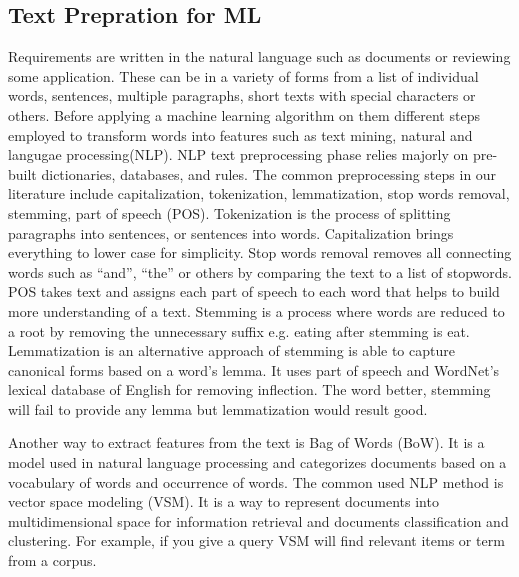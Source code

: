\subsection{Text Prepration for ML}
\label{sec:preprocessing}

Requirements are written in the natural language such as documents or reviewing
some application. These can be in a variety of forms from a list of individual
words, sentences, multiple paragraphs, short texts with special characters or
others. Before applying a machine learning algorithm on them different steps
employed to transform words into features such as text mining, natural and langugae processing(NLP). NLP text preprocessing phase relies
majorly on pre-built dictionaries, databases, and rules. The common
preprocessing steps in our literature include capitalization, tokenization,
lemmatization, stop words removal, stemming, part of speech (POS). Tokenization
is the process of splitting paragraphs into sentences, or sentences into words.
Capitalization brings everything to lower case for simplicity. Stop words
removal removes all connecting words such as ``and'', ``the'' or others by
comparing the text to a list of stopwords. POS takes text and assigns each part of speech to each
word that helps to build more understanding of a text. Stemming is a process
where words are reduced to a root by removing the unnecessary suffix e.g. eating
after stemming is eat. Lemmatization is an alternative approach of stemming is
able to capture canonical forms based on a word's lemma. It uses part of speech
and WordNet’s lexical database of English for removing inflection. The word
better, stemming will fail to provide any lemma but lemmatization would result
good.

 	Another way to extract features from the text is Bag of Words (BoW). It is a
 model used in natural language processing and categorizes documents based on a
 vocabulary of words and occurrence of words. The common used NLP method is
 vector space modeling (VSM). It is a way to represent documents into
 multidimensional space for information retrieval and documents classification
 and clustering. For example, if you give a query VSM will find relevant items
 or term from a corpus.

